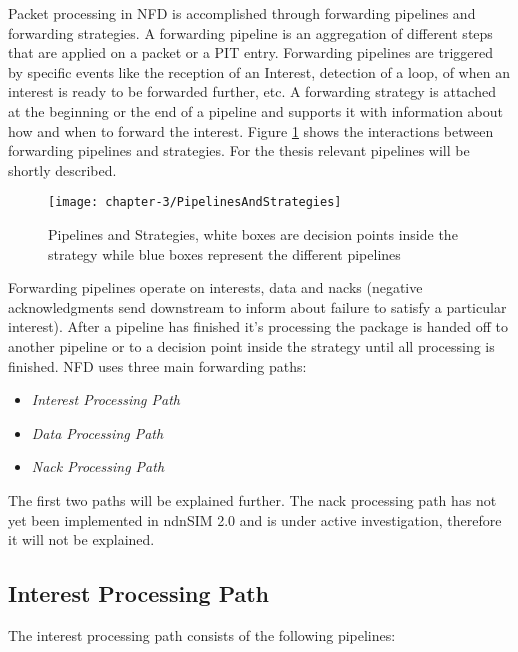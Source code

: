 Packet processing in NFD is accomplished through forwarding pipelines and forwarding strategies. A forwarding pipeline is an aggregation of different steps that are applied on a packet or a PIT entry. Forwarding pipelines are triggered by specific events like the reception of an Interest, detection of a loop, of when an interest is ready to be forwarded further, etc. A forwarding strategy is attached at the beginning or the end of a pipeline and supports it with information about how and when to forward the interest. Figure \ref{fig:PipelinesAndStrategies} shows the interactions between forwarding pipelines and strategies. For the thesis relevant pipelines will be shortly described.

\begin{figure}[H]
  \centering
  \texttt{[image: chapter-3/PipelinesAndStrategies]}
  \caption{Pipelines and Strategies, white boxes are decision points inside the strategy while blue boxes represent the different pipelines}
  \label{fig:PipelinesAndStrategies}
\end{figure}

Forwarding pipelines operate on interests, data and nacks (negative acknowledgments send downstream to inform about failure to satisfy a particular interest). After a pipeline has finished it's processing the package is handed off to another pipeline or to a decision point inside the strategy until all processing is finished. NFD uses three main forwarding paths:

\begin{itemize}
\item \emph{Interest Processing Path}
\item \emph{Data Processing Path}
\item \emph{Nack Processing Path}
\end{itemize}

The first two paths will be explained further. The nack processing path has not yet been implemented in ndnSIM 2.0 and is under active investigation, therefore it will not be explained.

\subsection{Interest Processing Path}

The interest processing path consists of the following pipelines:

